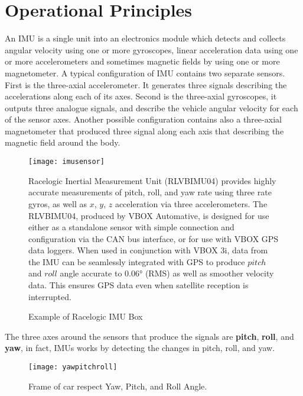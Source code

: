 \documentclass[tesi]{subfiles}
\begin{document}
\section{Operational Principles}\label{sc:Operational Principles}
An IMU is a single unit into an electronics module which detects and collects angular velocity using one or more gyroscopes, linear acceleration data using one or more accelerometers and sometimes magnetic fields by using one or more magnetometer.
A typical configuration of IMU contains two separate sensors. First is the three-axial accelerometer. It 
generates three signals describing the accelerations along each of its axes. Second is the three-axial gyroscopes, it  outputs three analogue signals, and describe the vehicle angular velocity for each of the sensor axes. Another possible configuration contains also a three-axial magnetometer that produced three signal along each axis that describing the magnetic field around the body.
\begin{center}
\begin{figure}[H]
\centering
\texttt{[image: imusensor]}
\begin{center}
\begin{small}
Racelogic Inertial Measurement Unit (RLVBIMU04) provides highly accurate measurements of pitch, roll, and yaw rate using three rate gyros, as well as $x$, $y$, $z$ acceleration via three accelerometers. 
The RLVBIMU04, produced by VBOX Automative, is designed for use either as a standalone sensor with simple connection and configuration via the CAN bus interface, or for use with VBOX GPS data loggers.
When used in conjunction with VBOX 3i, data from the IMU can be seamlessly integrated with GPS to produce $pitch$ and $roll$ angle accurate to $0.06\si{\degree}$ (RMS) as well as smoother velocity data. This ensures GPS data even when satellite reception is interrupted.
\end{small}
\end{center}
\caption{Example of Racelogic IMU Box}
\label{fig:IMU box}
\end{figure}
\end{center}



The three axes around the sensors that produce the signals are \textbf{pitch}, \textbf{roll}, and \textbf{yaw}, in fact, IMUs works by detecting the changes in pitch, roll, and yaw.

\begin{center}
\begin{figure}[h]
\centering
\label{fig:Yaw Roll Pitch Frame of car}
\texttt{[image: yawpitchroll]}
\caption{Frame of car respect Yaw, Pitch, and Roll Angle.}
\end{figure}
\end{center}
\end{document}

